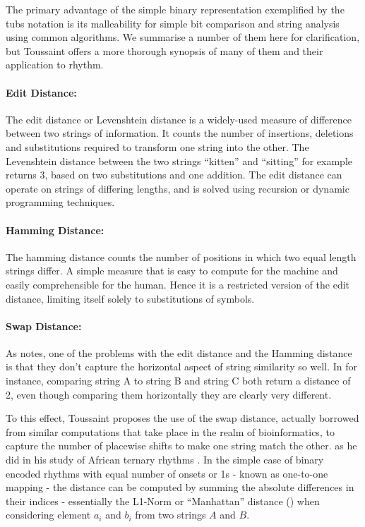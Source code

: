 The primary advantage of the simple binary representation exemplified by the \acrshort{tubs} notation is its malleability for simple bit comparison and string analysis using common algorithms. We summarise a number of them here for clarification, but Toussaint  offers a more thorough synopsis of many of them and their application to rhythm.

\paragraph{Edit Distance:} The edit distance or Levenshtein distance is a widely-used measure of difference between two strings of information. It counts the number of insertions, deletions and substitutions required to transform one string into the other. The  Levenshtein distance between the two strings “kitten” and “sitting” for example returns 3, based on two substitutions and one addition. The edit distance can operate on strings of differing lengths, and is solved using recursion or dynamic programming techniques.

\paragraph{Hamming Distance:} The hamming distance counts the number of positions in which two equal length strings differ. A simple measure that is easy to compute for the machine and easily comprehensible for the human. Hence it is a restricted version of the edit distance, limiting itself solely to substitutions of symbols.

\paragraph{Swap Distance:} As \cite{Toussaint2013} notes, one of the problems with the edit distance and the Hamming distance is that they don’t capture the horizontal aspect of string similarity so well. In  for instance, comparing string A to string B and string C both return a distance of 2, even though comparing them horizontally they are clearly very different.

To this effect, Toussaint proposes the use of the swap distance, actually borrowed from similar computations that take place in the realm of bioinformatics, to capture the number of placewise shifts to make one string match the other. as he did in his study of African ternary rhythms \citep{Toussaint2003}. In the simple case of binary encoded rhythms with equal number of onsets or 1s - known as one-to-one mapping - the distance can be computed by summing the absolute differences in their indices \citep{Toussaint2016} - essentially the L1-Norm or ``Manhattan'' distance () when considering element $a_i$ and $b_i$ from two strings $A$ and $B$.

